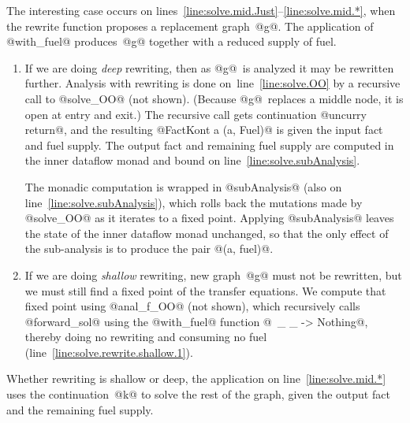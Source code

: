 \documentclass[blockstyle,preprint,natbib,nocopyrightspace]{sigplanconf}
\newcommand\lineref[1]{line~\ref{line:#1}}
\newcommand\linerangeref[2]{\mbox{lines~\ref{line:#1}--\ref{line:#2}}}
\begin{document}
The interesting case occurs on \linerangeref{solve.mid.Just}{solve.mid.*},
when the rewrite function 
proposes a replacement graph~@g@.
The application of @with_fuel@ produces~@g@ together with a reduced
supply of fuel.
\begin{enumerate}
\item
If we are doing \emph{deep} rewriting, then as @g@~is analyzed
it may be rewritten further.
Analysis with rewriting is done
on~\lineref{solve.OO}
by a recursive call to @solve_OO@ (not shown).
(Because @g@~replaces a middle node, it is open at entry and exit.)
The recursive call gets continuation @uncurry return@, and the
resulting @FactKont a (a, Fuel)@ is given
the input fact and fuel supply.
The output fact and remaining
fuel supply are computed in the inner dataflow monad and bound on
\lineref{solve.subAnalysis}. 

The monadic computation is wrapped in @subAnalysis@ (also on
\lineref{solve.subAnalysis}), which rolls back the mutations
made by @solve_OO@ as it iterates to a fixed point.
Applying @subAnalysis@ leaves the state of the inner dataflow monad
unchanged, so that the only effect of the sub-analysis is to produce
 the pair @(a, fuel)@.
\item
If we are doing \emph{shallow} rewriting,  new graph~@g@ must not be
rewritten, but we must still find a fixed point of the transfer
equations.
We compute that fixed point using @anal_f_OO@ (not shown), which  recursively calls
@forward_sol@ using the @with_fuel@ function
@\ _ _ -> Nothing@, 
thereby doing no rewriting and consuming no fuel
(\lineref{solve.rewrite.shallow.1}).
\end{enumerate}
Whether rewriting is shallow or deep, the application on
\lineref{solve.mid.*} uses the continuation~@k@ to solve the rest of
the graph, given the output fact and the remaining fuel supply.
\end{document}
